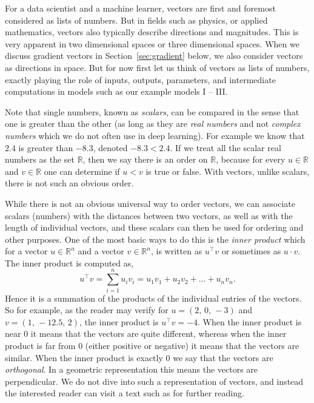 \documentclass[12pt]{article}
\begin{document}
For a data scientist and a machine learner, vectors are first and foremost considered as lists of numbers. But in fields such as physics, or applied mathematics, vectors also typically describe directions and magnitudes. This is very apparent in two dimensional spaces or three dimensional spaces. When we discuss gradient vectors in Section~\ref{sec:gradient} below, we also consider vectors as directions in space. But for now first let us think of vectors as lists of numbers, exactly playing the role of inputs, outputs, parameters, and intermediate computations in models such as our example models I -- III.

Note that single numbers, known as {\em scalars}, can be compared in the sense that one is greater than the other (as long as they are {\em real numbers} and not {\em complex numbers} which we do not often use in deep learning). For example we know that $2.4$ is greater than $-8.3$, denoted $-8.3 < 2.4$. If we treat all the scalar real numbers as the set ${\mathbb R}$, then we say there is an order on ${\mathbb R}$, because for every $u \in {\mathbb R}$ and $v \in {\mathbb R}$ one can determine if $u < v$ is true or false. With vectors, unlike scalars, there is not such an obvious order. 

While there is not an obvious universal way to order vectors, we can associate scalars (numbers) with the distances between two vectors, as well as with the length of individual vectors, and these scalars can then be used for ordering and other purposes. One of the most basic ways to do this is the {\em inner product} which for a vector $u \in {\mathbb R}^n$ and a vector $v \in {\mathbb R}^n$, is written as $u^\top v$ or sometimes as $u \cdot v$. The inner product is computed as,
%
\begin{equation}
\label{eq:inner product}
u^\top v = \sum_{i=1}^n u_i v_i = u_1 v_1 + u_2 v_2 + \ldots + u_n v_n.
\end{equation}
%
Hence it is a summation of the products of the individual entries of the vectors. So for example, as the reader may verify for $u=(2,\, 0, \, -3)$ and $v=(1,\, -12.5, \, 2)$, the inner product is $u^\top v = -4$. When the inner product is near $0$ it means that the vectors are quite different, whereas when the inner product is far from $0$ (either positive or negative) it means that the vectors are similar. When the inner product is exactly $0$ we say that the vectors are {\em orthogonal}. In a geometric representation this means the vectors are perpendicular. We do not dive into such a representation of vectors, and instead the interested reader can visit a text such as \cite{boyd2018introduction} for further reading.
\end{document}
